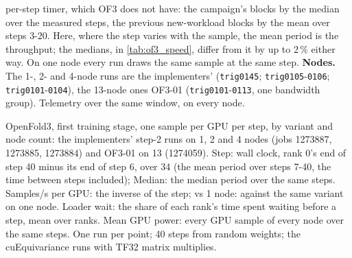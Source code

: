 per-step timer, which OF3 does not have: the campaign's blocks by the median over the measured steps, the previous new-workload blocks by the mean over steps 3-20. Here, where the step varies with the sample, the mean period is the throughput; the medians, in \cref{tab:of3_speed}, differ from it by up to 2\,\% either way. On one node every run draws the same sample at the same step. \textbf{Nodes.} The 1-, 2- and 4-node runs are the implementers' (\texttt{trig0145}; \texttt{trig0105}-\texttt{0106}; \texttt{trig0101}-\texttt{0104}), the 13-node ones OF3-01 (\texttt{trig0101}-\texttt{0113}, one bandwidth group). Telemetry over the same window, on every node.

\begin{table}[ht]
  \caption{OpenFold3, first training stage, one sample per GPU per step, by variant and node count: the implementers' step-2 runs on 1, 2 and 4 nodes (jobs 1273887, 1273885, 1273884) and OF3-01 on 13 (1274059). Step: wall clock, rank 0's end of step 40 minus its end of step 6, over 34 (the mean period over steps 7-40, the time between steps included); Median: the median period over the same steps. Samples/s per GPU: the inverse of the step; vs 1 node: against the same variant on one node. Loader wait: the share of each rank's time spent waiting before a step, mean over ranks. Mean GPU power: every GPU sample of every node over the same steps. One run per point; 40 steps from random weights; the cuEquivariance runs with TF32 matrix multiplies.}
  \label{tab:of3_speed}
  \centering\small
  \begin{adjustbox}{max width=\linewidth}
  \end{adjustbox}
\end{table}

